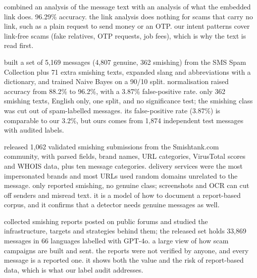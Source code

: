   combined an analysis of the message text with an analysis of what the embedded link does.  96.29\% accuracy.  the link analysis does nothing for scams that carry no link, such as a plain request to send money or an OTP.  our intent patterns cover link-free scams (fake relatives, OTP requests, job fees), which is why the text is read first.

  built a set of 5,169 messages (4,807 genuine, 362 smishing) from the SMS Spam Collection plus 71 extra smishing texts, expanded slang and abbreviations with a dictionary, and trained Naive Bayes on a 90/10 split.  normalisation raised accuracy from 88.2\% to 96.2\%, with a 3.87\% false-positive rate.  only 362 smishing texts, English only, one split, and no significance test; the smishing class was cut out of spam-labelled messages.  its false-positive rate (3.87\%) is comparable to our 3.2\%, but ours comes from 1,874 independent test messages with audited labels.

  released 1,062 validated smishing submissions from the Smishtank.com community, with parsed fields, brand names, URL categories, VirusTotal scores and WHOIS data, plus ten message categories.  delivery services were the most impersonated brands and most URLs used random domains unrelated to the message.  only reported smishing, no genuine class; screenshots and OCR can cut off senders and misread text.  it is a model of how to document a report-based corpus, and it confirms that a detector needs genuine messages as well.

  collected smishing reports posted on public forums and studied the infrastructure, targets and strategies behind them; the released set holds 33,869 messages in 66 languages labelled with GPT-4o.  a large view of how scam campaigns are built and sent.  the reports were not verified by anyone, and every message is a reported one.  it shows both the value and the risk of report-based data, which is what our label audit addresses.

